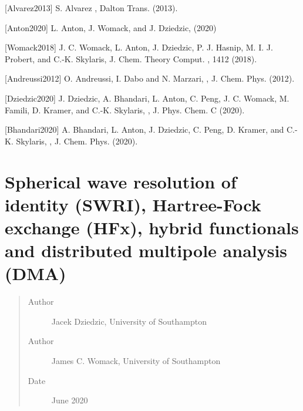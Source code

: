 \documentclass[letterpaper,10pt,english]{sphinxmanual}
\begin{document}
{[}Alvarez2013{]} S. Alvarez , Dalton Trans.  (2013).

{[}Anton2020{]} L. Anton, J. Womack, and J. Dziedzic,  (2020) 

{[}Womack2018{]} J. C. Womack, L. Anton, J. Dziedzic, P. J. Hasnip, M. I. J. Probert, and C.-K. Skylaris, J. Chem. Theory Comput. , 1412 (2018).

{[}Andreussi2012{]} O. Andreussi, I. Dabo and N. Marzari, , J. Chem. Phys.  (2012).

{[}Dziedzic2020{]} J. Dziedzic, A. Bhandari, L. Anton, C. Peng, J. C. Womack, M. Famili, D. Kramer, and C.-K. Skylaris, , J. Phys. Chem. C  (2020).

{[}Bhandari2020{]} A. Bhandari, L. Anton, J. Dziedzic, C. Peng, D. Kramer, and C.-K. Skylaris, , J. Chem. Phys.  (2020).


\section{Spherical wave resolution of identity (SWRI), Hartree-Fock exchange (HFx), hybrid functionals and distributed multipole analysis (DMA)}
\label{\detokenize{hfx::doc}}\label{\detokenize{hfx:spherical-wave-resolution-of-identity-swri-hartree-fock-exchange-hfx-hybrid-functionals-and-distributed-multipole-analysis-dma}}\begin{quote}\begin{description}
\item[{Author}] \leavevmode
Jacek Dziedzic, University of Southampton

\item[{Author}] \leavevmode
James C. Womack, University of Southampton

\item[{Date}] \leavevmode
June 2020

\end{description}\end{quote}
\end{document}
